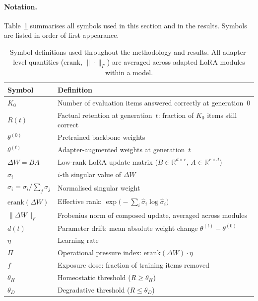 \documentclass[a4paper,fleqn]{cas-dc}
\newif\ifshowchanges
\newcommand{\rev}[1]{\ifshowchanges{\color{blue}#1}\else{#1}\fi}
\begin{document}
\rev{%
\paragraph{Notation.}
Table~\ref{tab:notation} summarises all symbols used in this section and in
the results.  Symbols are listed in order of first appearance.

\begin{table}[h]
\caption{\rev{Symbol definitions used throughout the methodology and results.
All adapter-level quantities ($\mathrm{erank}$, $\|\cdot\|_F$) are averaged
across adapted LoRA modules within a model.}}
\label{tab:notation}
\small
\begin{tabular*}{\columnwidth}{@{\extracolsep{\fill}}ll}
\toprule
\textbf{Symbol} & \textbf{Definition} \\
\midrule
$K_0$          & Number of evaluation items answered correctly at generation~0 \\
$R(t)$         & Factual retention at generation~$t$: fraction of $K_0$ items
                 still correct \\
$\theta^{(0)}$ & Pretrained backbone weights \\
$\theta^{(t)}$ & Adapter-augmented weights at generation~$t$ \\
$\Delta W = BA$& Low-rank LoRA update matrix ($B \in \mathbb{R}^{d\times r}$,
                 $A \in \mathbb{R}^{r\times d}$) \\
$\sigma_i$     & $i$-th singular value of $\Delta W$ \\
$\hat{\sigma}_i = \sigma_i / \sum_j \sigma_j$ & Normalised singular weight \\
$\mathrm{erank}(\Delta W)$ & Effective rank:
                 $\exp\!\bigl(-\sum_i \hat{\sigma}_i \log \hat{\sigma}_i\bigr)$ \\
$\|\Delta W\|_F$ & Frobenius norm of composed update, averaged across modules \\
$d(t)$         & Parameter drift: mean absolute weight change
                 $\theta^{(t)}-\theta^{(0)}$ \\
$\eta$         & Learning rate \\
$\Pi$          & Operational pressure index: $\mathrm{erank}(\Delta W)\cdot\eta$ \\
$f$            & Exposure dose: fraction of training items removed \\
$\theta_H$     & Homeostatic threshold ($R \ge \theta_H$) \\
$\theta_D$     & Degradative threshold ($R \le \theta_D$) \\

\end{tabular*}
\end{table}}
\end{document}
